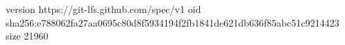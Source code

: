 version https://git-lfs.github.com/spec/v1
oid sha256:e788062fa27aa0695c80d8f5934194f2fb1841de621db636f85abc51c9214423
size 21960
